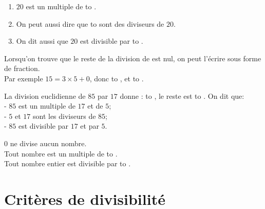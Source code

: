 \documentclass[12pt]{article}
\newif\iftrou\troutrue
\newlength{\trouwidth}
\newcommand{\trou}[1]{%
	\iftrou%
	\settowidth{\trouwidth}{#1}%
	\hbox to \trouwidth{\dotfill}%
	\else%
	#1%
	\fi}
\begin{document}
\begin{ex}{}{}
	\begin{enumerate}
		\item $20$ est un multiple de \trou{$1$; $2$; $4$; $5$; $10$ et $20$}.
		\item On peut aussi dire que \trou{$1$; $2$; $4$; $5$; $10$ et $20$} sont des diviseurs de $20$.
		\item On dit aussi que $20$ est divisible par  \trou{$1$; $2$; $4$; $5$; $10$ et $20$}.
	\end{enumerate}
\end{ex}

\begin{rem}{}{}
	Lorsqu'on trouve que le reste de la division de est nul, on peut l'écrire sous forme de fraction. 
	\\
	Par exemple $15=3\times 5 +0$, donc \trou{$\dfrac{15}{5}=3$}, et \trou{$\dfrac{15}{3}=5$}.
\end{rem}


\begin{ex}{}{}
	La division euclidienne de $85$ par $17$ donne : \trou{$85 = 17 \times 5 + 0$}, le reste est \trou{nul}. On dit que:\\
	- $85$ est un multiple de $17$ et de $5$;\\
	- $5$ et $17$ sont les diviseurs de $85$;\\
	- $85$ est divisible par $17$ et par $5$.
\end{ex}

\begin{rem}{}{}
	$0$ ne divise aucun nombre.\\
	Tout nombre est un multiple de \trou{$~1~$}.\\
	Tout nombre entier est divisible par \trou{$1$ et par lui-même}.
\end{rem}





\section{Critères de divisibilité}
\end{document}
